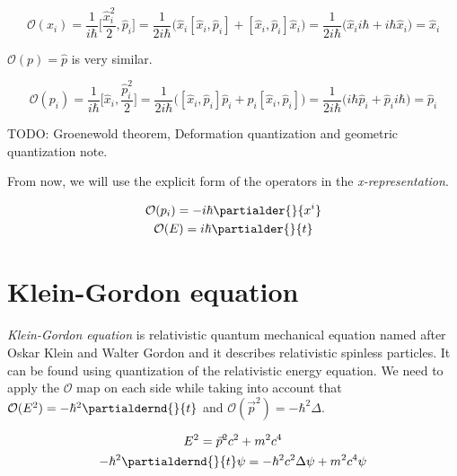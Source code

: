 \begin{equation*}
    \mathcal{O}(x_{i}) = \frac{1}{i \hbar}\bigg[\frac{\hat{x}_{i}^{2}}{2}, \hat{p}_{i}\bigg] = 
    \frac{1}{2 i \hbar} \big(\hat{x}_{i} [\hat{x}_{i}, \hat{p}_{i}] + [\hat{x}_{i}, \hat{p}_{i}] \hat{x}_{i}\big) =
    \frac{1}{2 i \hbar} \big(\hat{x}_{i} i \hbar + i \hbar \hat{x}_{i}\big) = \hat{x}_{i}
\end{equation*}

 $\mathcal{O}(p) = \hat{p}$ is very similar.

\begin{equation*}
    \mathcal{O}(p_{i}) = \frac{1}{i \hbar}\bigg[\hat{x}_{i}, \frac{\hat{p}_{i}^{2}}{2}\bigg] = 
    \frac{1}{2 i \hbar} \big([\hat{x}_{i}, \hat{p}_{i}] \hat{p}_{i} + \hat{p}_{i} [\hat{x}_{i}, \hat{p}_{i}]\big) =
    \frac{1}{2 i \hbar} \big(i \hbar \hat{p}_{i} + \hat{p}_{i} i \hbar \big) = \hat{p}_{i}
\end{equation*}

TODO: Groenewold theorem, Deformation quantization and geometric quantization note.

From now, we will use the explicit form of the operators in the \textit{x-representation}.

\begin{equation}
    \begin{gathered}
        \mathcal{O}(p_{i}) = - i \hbar \partialder{}{x^{i}} \\
        \mathcal{O}(E) = i \hbar \partialder{}{t}
    \end{gathered}
\end{equation}


\section{Klein-Gordon equation}

\paragraph{} \textit{Klein-Gordon equation} is relativistic quantum mechanical equation named after Oskar Klein and Walter Gordon and
it describes relativistic spinless particles. It can be found using quantization of the relativistic energy equation. We need to apply the
$\mathcal{O}$ map on each side while taking into account that $\mathcal{O}(E^2) = - \hbar^{2} \partialdernd{}{t}$ and 
$\mathcal{O}(\vec{p}^2) = - \hbar^{2} \Delta$.

\begin{equation*}
    \begin{gathered}
        E^{2} = \vec{p}^{2} c^{2} + m^{2} c^{4} \\
        - \hbar^{2} \partialdernd{}{t} \psi = - \hbar^{2} c^{2} \Delta \psi + m^{2} c^{4} \psi
    \end{gathered}
\end{equation*}

